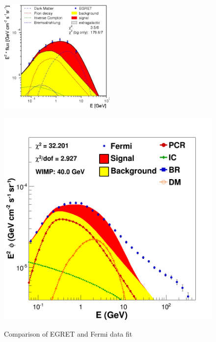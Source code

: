 \begin{figure}[h]
  \centering
  \begin{minipage}[h]{0.45\textwidth}
  	\centering
	\includegraphics[width=\linewidth, height=5.6cm]{pic/results/EGRET_A.png}
  	\label{fig:EGRET_comp_a}
  \end{minipage}
  \hfill  
  \begin{minipage}[h]{0.45\textwidth}
  	\centering
	\includegraphics[width=1.\linewidth]{pic/results/asEGRET_Fermi_A.png}
  	\label{fig:EGRET_comp_b}
  \end{minipage}
  \caption{Comparison of EGRET and Fermi data fit}
  \label{fig:EGRET_comp}
\end{figure}


